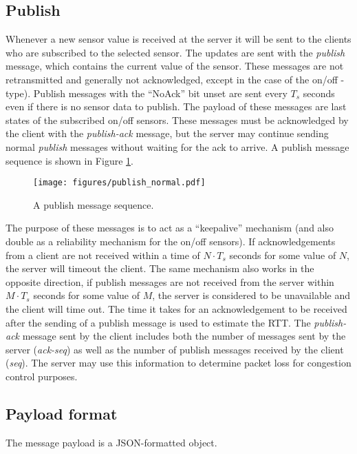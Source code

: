 \documentclass[a4paper]{article}
\begin{document}
\subsection{Publish}
Whenever a new sensor value is received at the server it will be sent to the 
clients who are subscribed to the selected sensor. The updates are sent with
the \emph{publish} message, which contains the current value of the sensor.
These messages are not retransmitted and generally not acknowledged, except in the case of the on/off -type). Publish
messages with the ``NoAck'' bit unset are sent every $T_s$ seconds even if there
is no sensor data to publish. The payload of these messages are last states
of the subscribed on/off sensors. These messages must be acknowledged by the client 
with the \emph{publish-ack} message, but the server may continue sending normal \emph{publish} messages without waiting for the ack to arrive. A publish message
sequence is shown in Figure \ref{fig:pub_normal}.

\begin{figure}
	\centering
    \texttt{[image: figures/publish\_normal.pdf]}
    \caption{A publish message sequence.}
    \label{fig:pub_normal}
\end{figure}

The purpose of these messages is to act as a ``keepalive'' mechanism (and also double
as a reliability mechanism for the on/off sensors). If acknowledgements from a client
are not received within a time of $N \cdot T_s$ seconds for some value of $N$, the 
server will timeout the client. The same mechanism also works in the opposite 
direction, if publish messages are not received from the server within 
$M \cdot T_s$ seconds for some value of $M$,
the server is considered to be unavailable and the client will time out. The time it takes for an acknowledgement to be received after the sending of
a publish message is used to estimate the RTT.
The \emph{publish-ack} message sent by the client includes both the number of messages sent by the server (\emph{ack-seq}) as well as the number of publish messages received by the client (\emph{seq}).
The server may use this information to determine packet loss for congestion control purposes.

\subsection{Payload format}
\label{payload-format}

The message payload is a JSON-formatted object.
\end{document}
